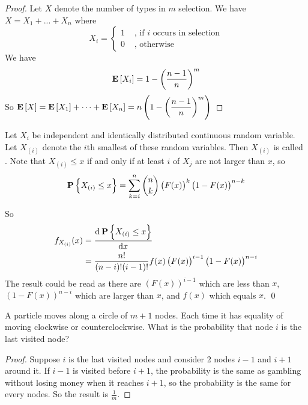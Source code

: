 \begin{proof}
    Let $X$ denote the number of types in $m$ selection. We have $X = X_1 + ... + X_n$ where
    \begin{equation*}
        X_i = \begin{cases}
            1 & \text{ , if } i \text{ occurs in selection} \\
            0 & \text{ , otherwise}
        \end{cases}
    \end{equation*}
    We have 
    \begin{equation*}
        \mathop{\bf E\/}\displaystyle \left[ X_i \right] = 1 - \left(\frac{n - 1}{n} \right)^m
    \end{equation*}
    So $\mathop{\bf E\/}\displaystyle \left[ X \right] = \mathop{\bf E\/}\displaystyle \left[ X_1 \right] + \dots + \mathop{\bf E\/}\displaystyle \left[ X_n \right] = \displaystyle n \left(1 - \left(\frac{n - 1}{n} \right)^m \right)$
\end{proof}

\begin{example}
    Let $X_i$ be independent and identically distributed continuous random variable. Let $X_{(i)}$ denote the $i$th smallest of these random variables. Then $X_{(i)}$ is called . Note that $X_{(i)} \leq x$ if and only if at least $i$ of $X_j$ are not larger than $x$, so
    \begin{equation*}
        \mathop{\bf P\/}\displaystyle \left\{X_{(i)} \leq x\right\} = \sum_{k=i}^n \binom{n}{k} \left(F(x) \right)^k \left(1 - F(x) \right)^{n-k}
    \end{equation*}
    
    So
    \begin{equation*}
        \begin{aligned}
            f_{X_{(i)}} (x) &= \dod{\probability{X_{(i)} \leq x}}{x} \\
            &= \frac{n!}{(n-i)!(i-1)!} f(x) \left( F(x) \right)^{i-1} \left(1-F(x) \right)^{n-i}
        \end{aligned}
    \end{equation*}
    The result could be read as there are $\left( F(x) \right)^{i-1}$ which are less than $x$, $\left(1-F(x) \right)^{n-i}$ which are larger than $x$, and $f(x)$ which equals $x$. \qed
\end{example}

\begin{example}
A particle moves along a circle of $m+1$ nodes. Each time it has equality of moving clockwise or counterclockwise. What is the probability that node $i$ is the last visited node?    
\end{example}
\begin{proof}
    Suppose $i$ is the last visited nodes and consider 2 nodes $i-1$ and $i+1$ around it. If $i-1$ is visited before $i+1$, the probability is the same as gambling without losing money when it reaches $i+1$, so the probability is the same for every nodes. So the result is $\displaystyle \frac{1}{m}$.
\end{proof}


